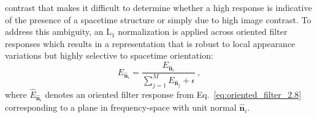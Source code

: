 contrast that makes 
it difficult to determine
whether a high response is indicative of the presence of
a spacetime structure or simply due to high image
contrast.
To address this ambiguity, an $\textrm{L}_1$
normalization is applied across oriented filter responses which
results in a representation that is robust to local
appearance variations but highly selective to 
spacetime orientation:
\begin{equation}
	\hat{E}_{\hat{\mathbf{n}}_i} = \frac{E_{\hat{\mathbf{n}}_i}}{\sum_{j = 1}^{M}{E_{\hat{\mathbf{n}}_j}} + \epsilon} \ ,
\end{equation}
where $\hat{E}_{\hat{\mathbf{n}}_i}$ denotes an oriented filter response from Eq.\ \ref{eq:oriented_filter_2.8} corresponding to a plane in frequency-space with unit normal $\hat{\mathbf{n}}_i$.